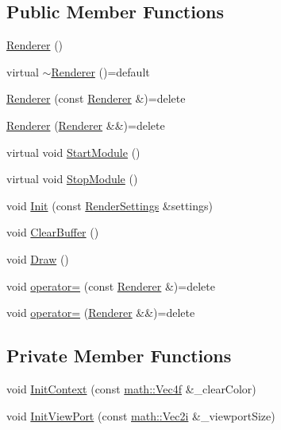 \subsection*{Public Member Functions}
\begin{DoxyCompactItemize}
\item 
\mbox{\hyperlink{classpad_1_1gfx_1_1_renderer_a31e4f7095746776998b8d9826dd48e69}{Renderer}} ()
\item 
virtual \mbox{\hyperlink{classpad_1_1gfx_1_1_renderer_a104d47988f127a95e78ed01a29b70d39}{$\sim$\+Renderer}} ()=default
\item 
\mbox{\hyperlink{classpad_1_1gfx_1_1_renderer_a2bcf737a8d0e8964e69aa391995335d2}{Renderer}} (const \mbox{\hyperlink{classpad_1_1gfx_1_1_renderer}{Renderer}} \&)=delete
\item 
\mbox{\hyperlink{classpad_1_1gfx_1_1_renderer_afef3c09f0e69578c3c70a271d37b5c86}{Renderer}} (\mbox{\hyperlink{classpad_1_1gfx_1_1_renderer}{Renderer}} \&\&)=delete
\item 
virtual void \mbox{\hyperlink{classpad_1_1gfx_1_1_renderer_af78164b0fc174776bf1345c99d5c08b4}{Start\+Module}} ()
\item 
virtual void \mbox{\hyperlink{classpad_1_1gfx_1_1_renderer_ad90dc994132b8f4028eaa5b9af87b601}{Stop\+Module}} ()
\item 
void \mbox{\hyperlink{classpad_1_1gfx_1_1_renderer_a28ca09b90cf50729dcca9e6c6e7150d3}{Init}} (const \mbox{\hyperlink{structpad_1_1gfx_1_1_render_settings}{Render\+Settings}} \&settings)
\item 
void \mbox{\hyperlink{classpad_1_1gfx_1_1_renderer_a9a2be08d5d678ba36dbf94f2690c57fb}{Clear\+Buffer}} ()
\item 
void \mbox{\hyperlink{classpad_1_1gfx_1_1_renderer_ae7e6d57e172a8921b44fe41e976f0d0f}{Draw}} ()
\item 
void \mbox{\hyperlink{classpad_1_1gfx_1_1_renderer_a0988ec219668aa3a4410c31161cac8ac}{operator=}} (const \mbox{\hyperlink{classpad_1_1gfx_1_1_renderer}{Renderer}} \&)=delete
\item 
void \mbox{\hyperlink{classpad_1_1gfx_1_1_renderer_a2ea30dd98eda5c1a840d598e8de57dc1}{operator=}} (\mbox{\hyperlink{classpad_1_1gfx_1_1_renderer}{Renderer}} \&\&)=delete
\end{DoxyCompactItemize}
\subsection*{Private Member Functions}
\begin{DoxyCompactItemize}
\item 
void \mbox{\hyperlink{classpad_1_1gfx_1_1_renderer_a231a9121b1b95e52eae5fab21cd8785c}{Init\+Context}} (const \mbox{\hyperlink{namespacepad_1_1math_a4eb77014ac7b74bd24cf73bca82ac3a3}{math\+::\+Vec4f}} \&\+\_\+clear\+Color)
\item 
void \mbox{\hyperlink{classpad_1_1gfx_1_1_renderer_a403e00bd5a3c5f91c5505332dda41a3e}{Init\+View\+Port}} (const \mbox{\hyperlink{namespacepad_1_1math_a808a631a6bccd994f9589d7fb86bad41}{math\+::\+Vec2i}} \&\+\_\+viewport\+Size)
\end{DoxyCompactItemize}



